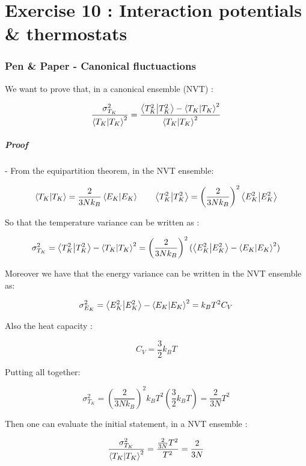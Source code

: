 \chapter*{Exercise 10 : Interaction potentials \& thermostats}

\subsection*{Pen \& Paper - Canonical fluctuactions}

We want to prove that, in a canonical ensemble (NVT) : 

$$ \frac{\sigma^2_{T_K}}{\braket{T_K}^2} = \frac{\braket{T^2_K}-\braket{T_K}^2}{\braket{T_K}^2}$$

\paragraph{Proof} - From the equipartition theorem, in the NVT ensemble:

$$ \braket{T_K} = \frac{2}{3Nk_B} \braket{E_K} \qquad \braket{T^2_K} = \left(\frac{2}{3Nk_B}\right)^2 \braket{E^2_K} $$

So that the temperature variance can be written as :

$$ \sigma^2_{T_K} = \braket{T^2_K}-\braket{T_K}^2 = \left(\frac{2}{3Nk_B}\right)^2 (\braket{E^2_K} - \braket{E_K}^2) $$

Moreover we have that the energy variance can be written in the NVT ensemble as:

$$ \sigma^2_{E_K} = \braket{E^2_K} - \braket{E_K}^2 = k_B T^2 C_V $$

Also the heat capacity :

$$ C_V = \frac{3}{2}k_B T $$

Putting all together:

$$ \sigma^2_{T_K} = \left(\frac{2}{3Nk_B}\right)^2 k_B T^2 \left(\frac{3}{2}k_B T \right) = \frac{2}{3N}T^2 $$

Then one can evaluate the initial statement, in a NVT ensemble :

$$ \frac{\sigma^2_{T_K}}{\braket{T_K}^2} = \frac{\frac{2}{3N}T^2}{T^2} = \frac{2}{3N}$$

